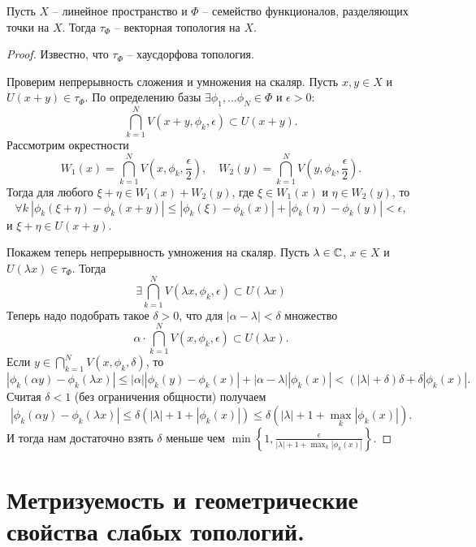 \begin{proposition}
    Пусть $X$ -- линейное пространство и $\Phi$ -- семейство функционалов, разделяющих точки на $X$.
    Тогда $\tau_\Phi$ -- векторная топология на $X$.
\end{proposition}
\begin{proof}
    Известно, что $\tau_\Phi$ -- хаусдорфова топология.

    Проверим непрерывность сложения и умножения на скаляр.
    Пусть $x, y \in X$ и $U(x + y) \in \tau_{\Phi}$.
    По определению базы $\exists \phi_1, \ldots \phi_N \in \Phi$ и $\epsilon > 0$:
    \[
        \bigcap_{k = 1}^{N} V(x + y, \phi_k, \epsilon) \subset U(x + y).
    \]
    Рассмотрим окрестности
    \[
        W_1(x) = \bigcap_{k = 1}^{N} V\left(x, \phi_k, \frac{\epsilon}{2}\right), \quad W_2(y) = \bigcap_{k = 1}^{N} V\left(y, \phi_k, \frac{\epsilon}{2}\right).
    \]
    Тогда для любого $\xi + \eta \in W_1(x) + W_2(y)$, где $\xi \in W_1(x)$ и $\eta \in W_2(y)$, то
    \[
        \forall k \ |\phi_k(\xi + \eta) - \phi_k(x + y)| \leq |\phi_k(\xi) - \phi_k(x)| + |\phi_k(\eta) - \phi_k(y)| < \epsilon,
    \]
    и $\xi + \eta \in U(x + y)$.

    Покажем теперь непрерывность умножения на скаляр.
    Пусть $\lambda \in \mathbb{C}$, $x \in X$ и $U(\lambda x) \in \tau_\Phi$.
    Тогда
    \[
        \exists \bigcap_{k = 1}^{N} V(\lambda x, \phi_k, \epsilon) \subset U(\lambda x)
    \]
     Теперь надо подобрать такое $\delta > 0$, что для $|\alpha - \lambda| < \delta$ множество
    \[
        \alpha \cdot \bigcap_{k = 1}^{N} V(x, \phi_k, \epsilon) \subset U(\lambda x).
    \]
    Если $y \in \bigcap_{k = 1}^{N} V(x, \phi_k, \delta)$, то
    \[
        |\phi_k(\alpha y) - \phi_k(\lambda x)| \leq |\alpha||\phi_k(y) - \phi_k(x)| + |\alpha - \lambda||\phi_k(x)| < (|\lambda| + \delta)\delta + \delta|\phi_k(x)|.
    \]
    Считая $\delta < 1$ (без ограничения общности) получаем
    \[
        |\phi_k(\alpha y) - \phi_k(\lambda x)| \leq \delta(|\lambda| + 1 + |\phi_k(x)|) \leq \delta(|\lambda| + 1 + \max_{k}|\phi_k(x)|).
    \]
    И тогда нам достаточно взять $\delta$ меньше чем $\min\left\{1, \frac{\epsilon}{|\lambda| + 1 + \max_{k}|\phi_k(x)|}\right\}$.
\end{proof}
\chapter{Метризуемость и геометрические свойства слабых топологий.}
